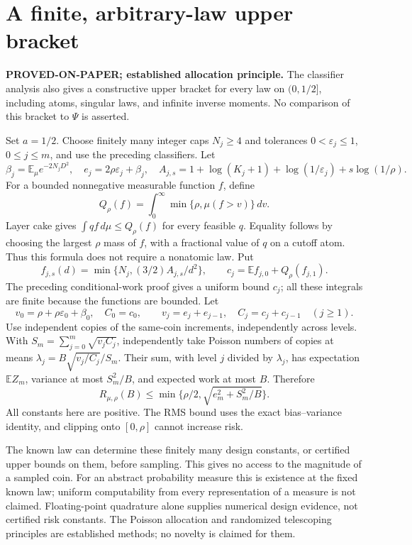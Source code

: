 \section{A finite, arbitrary-law upper bracket}
\noindent\textbf{PROVED-ON-PAPER; established allocation principle.}
The classifier analysis also gives a constructive upper bracket for every
law on $(0,1/2]$, including atoms, singular laws, and infinite inverse moments.
No comparison of this bracket to $\Psi$ is asserted.

Set $a=1/2$. Choose finitely many integer caps $N_j\ge4$ and tolerances
$0<\varepsilon_j\le1$, $0\le j\le m$, and use the preceding classifiers.
Let
\[
 \beta_j=\mathbb E_\mu e^{-2N_jD^2},\quad
 e_j=2\rho\varepsilon_j+\beta_j,\quad
 A_{j,s}=1+\log(K_j+1)+\log(1/\varepsilon_j)+s\log(1/\rho).
\]
For a bounded nonnegative measurable function $f$, define
\[
 Q_\rho(f)=\int_0^\infty\min\{\rho,\mu(f>v)\}\,dv.
\]
Layer cake gives $\int qf\,d\mu\le Q_\rho(f)$ for every feasible $q$.
Equality follows by choosing the largest $\rho$ mass of $f$, with a fractional
value of $q$ on a cutoff atom. Thus this formula does not require a nonatomic
law. Put
\[
 f_{j,s}(d)=\min\{N_j,(3/2)A_{j,s}/d^2\},\qquad
 c_j=\mathbb E f_{j,0}+Q_\rho(f_{j,1}).
\]
The preceding conditional-work proof gives a uniform bound $c_j$; all these
integrals are finite because the functions are bounded. Let
\[
 v_0=\rho+\rho\varepsilon_0+\beta_0,\quad C_0=c_0,
 \qquad v_j=e_j+e_{j-1},\quad C_j=c_j+c_{j-1}\quad(j\ge1).
\]
Use independent copies of the same-coin increments, independently across
levels. With $S_m=\sum_{j=0}^m\sqrt{v_jC_j}$, independently take
Poisson numbers of copies at means
$\lambda_j=B\sqrt{v_j/C_j}/S_m$. Their sum, with level $j$ divided by
$\lambda_j$, has expectation $\mathbb EZ_m$, variance at most $S_m^2/B$,
and expected work at most $B$. Therefore
\[
 R_{\mu,\rho}(B)\le
 \min\{\rho/2,\sqrt{e_m^2+S_m^2/B}\}.
\]
All constants here are positive. The RMS bound uses the exact bias--variance
identity, and clipping onto $[0,\rho]$ cannot increase risk.

The known law can determine these finitely many design constants, or certified
upper bounds on them, before sampling. This gives no access to the magnitude
of a sampled coin. For an abstract probability measure this is existence at
the fixed known law; uniform computability from every representation of a
measure is not claimed. Floating-point quadrature alone supplies numerical
design evidence, not certified risk constants. The Poisson allocation and
randomized telescoping principles are established methods; no novelty is
claimed for them.

